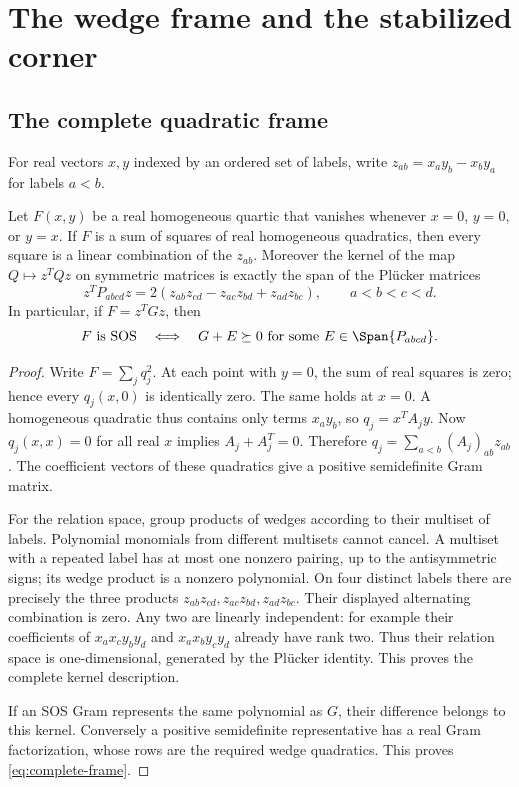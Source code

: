 \section{The wedge frame and the stabilized corner}\label{sec:corner}

\subsection{The complete quadratic frame}
For real vectors $x,y$ indexed by an ordered set of labels, write
$z_{ab}=x_ay_b-x_by_a$ for labels $a<b$.

\begin{lemma}\label{lem:frame}
Let $F(x,y)$ be a real homogeneous quartic that vanishes whenever
$x=0$, $y=0$, or $y=x$. If $F$ is a sum of squares of real homogeneous
quadratics, then every square is a linear combination of the $z_{ab}$.
Moreover the kernel of the map $Q\mapsto z^TQz$ on symmetric matrices
is exactly the span of the Pl\"ucker matrices
\[
 z^TP_{abcd}z=2(z_{ab}z_{cd}-z_{ac}z_{bd}+z_{ad}z_{bc}),
 \qquad a<b<c<d.
\]
In particular, if $F=z^TGz$, then
\begin{equation}\label{eq:complete-frame}
 F\text{ is SOS}\quad\Longleftrightarrow\quad
 G+E\succeq0\text{ for some }E\in\Span\{P_{abcd}\}.
\end{equation}
\end{lemma}
\begin{proof}
Write $F=\sum_jq_j^2$. At each point with $y=0$, the sum of real
squares is zero; hence every $q_j(x,0)$ is identically zero. The same
holds at $x=0$. A homogeneous quadratic thus contains only terms
$x_ay_b$, so $q_j=x^TA_jy$. Now $q_j(x,x)=0$ for all real $x$ implies
$A_j+A_j^T=0$. Therefore
$q_j=\sum_{a<b}(A_j)_{ab}z_{ab}$. The coefficient vectors of these
quadratics give a positive semidefinite Gram matrix.

For the relation space, group products of wedges according to their
multiset of labels. Polynomial monomials from different multisets
cannot cancel. A multiset with a repeated label has at most one
nonzero pairing, up to the antisymmetric signs; its wedge product is a
nonzero polynomial. On four distinct labels there are precisely the
three products
$z_{ab}z_{cd},z_{ac}z_{bd},z_{ad}z_{bc}$.
Their displayed alternating combination is zero. Any two are linearly
independent: for example their coefficients of
$x_ax_cy_by_d$ and $x_ax_by_cy_d$ already have rank two.
Thus their relation space is one-dimensional, generated by the
Pl\"ucker identity. This proves the complete kernel description.

If an SOS Gram represents the same polynomial as $G$, their
difference belongs to this kernel. Conversely a positive semidefinite
representative has a real Gram factorization, whose rows are the
required wedge quadratics. This proves \eqref{eq:complete-frame}.
\end{proof}

